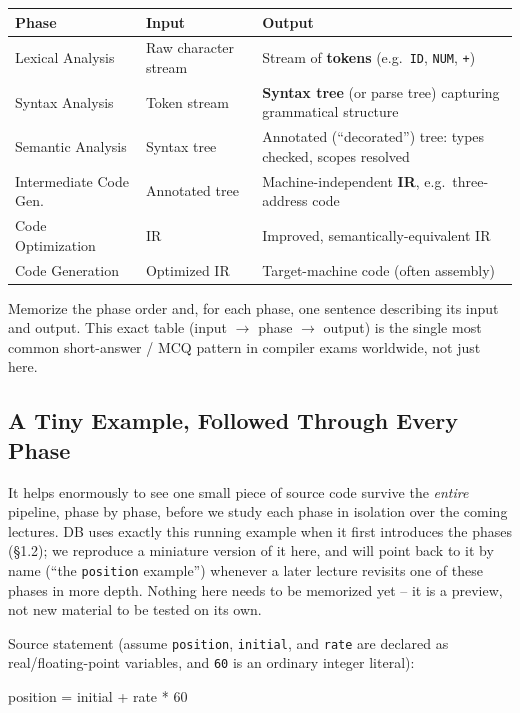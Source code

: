 \documentclass[full-course-notes.tex]{subfiles}
\begin{document}
\begin{center}
\renewcommand{\arraystretch}{1.3}
\begin{tabularx}{\textwidth}{@{}l l X@{}}
\toprule
\textbf{Phase} & \textbf{Input} & \textbf{Output} \\
\midrule
Lexical Analysis & Raw character stream & Stream of \textbf{tokens} (e.g.\ \texttt{ID}, \texttt{NUM}, \texttt{+}) \\
Syntax Analysis & Token stream & \textbf{Syntax tree} (or parse tree) capturing grammatical structure \\
Semantic Analysis & Syntax tree & Annotated (``decorated'') tree: types checked, scopes resolved \\
Intermediate Code Gen. & Annotated tree & Machine-independent \textbf{IR}, e.g.\ three-address code \\
Code Optimization & IR & Improved, semantically-equivalent IR \\
Code Generation & Optimized IR & Target-machine code (often assembly) \\
\bottomrule
\end{tabularx}
\end{center}

\begin{examfocus}
Memorize the phase order and, for each phase, one sentence describing its input and output.
This exact table (input $\to$ phase $\to$ output) is the single most common short-answer /
MCQ pattern in compiler exams worldwide, not just here.
\end{examfocus}

\subsection{A Tiny Example, Followed Through Every Phase}
\label{sec:l2-tiny-example}

\dbtag It helps enormously to see one small piece of source code survive the \emph{entire}
pipeline, phase by phase, before we study each phase in isolation over the coming lectures. DB
uses exactly this running example when it first introduces the phases (\S1.2); we reproduce a
miniature version of it here, and will point back to it by name (``the \texttt{position}
example'') whenever a later lecture revisits one of these phases in more depth. Nothing here
needs to be memorized yet -- it is a preview, not new material to be tested on its own.

Source statement (assume \texttt{position}, \texttt{initial}, and \texttt{rate} are declared as
real/floating-point variables, and \texttt{60} is an ordinary integer literal):
\begin{center}
\ttfamily position = initial + rate * 60
\end{center}
\end{document}
